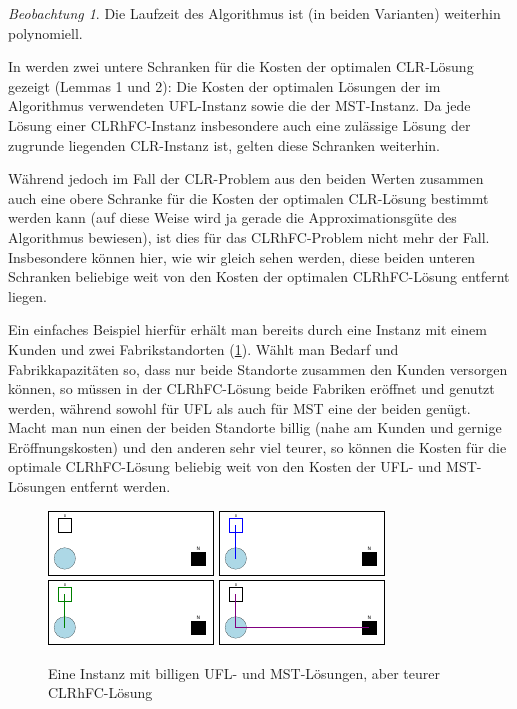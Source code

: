 \documentclass[a4paper,ngerman,11pt,bibtotoc]{scrartcl}
\theoremstyle{definition}
\theoremstyle{plain}
\theoremstyle{remark}
\newtheorem{beob}[defn]{Beobachtung}
\newcommand{\CLR}{CLR}
\newcommand{\CLRHFC}{CLRhFC}
\newcommand{\MST}{MST}
\newcommand{\UFL}{UFL}
\begin{document}
	\begin{beob}
		Die Laufzeit des Algorithmus ist (in beiden Varianten) weiterhin polynomiell. 
	\end{beob}
	
	In \cite{AAfCLR} werden zwei untere Schranken für die Kosten der optimalen \CLR-Lösung gezeigt (Lemmas 1 und 2): Die Kosten der optimalen Lösungen der im Algorithmus verwendeten \UFL-Instanz sowie die der \MST-Instanz. Da jede Lösung einer \CLRHFC-Instanz insbesondere auch eine zulässige Lösung der zugrunde liegenden \CLR-Instanz ist, gelten diese Schranken weiterhin.
	
	Während jedoch im Fall der \CLR-Problem aus den beiden Werten zusammen auch eine obere Schranke für die Kosten der optimalen \CLR-Lösung bestimmt werden kann (auf diese Weise wird ja gerade die Approximationsgüte des Algorithmus bewiesen), ist dies für das \CLRHFC-Problem nicht mehr der Fall. Insbesondere können hier, wie wir gleich sehen werden, diese beiden unteren Schranken beliebige weit von den Kosten der optimalen \CLRHFC-Lösung entfernt liegen.
	
	Ein einfaches Beispiel hierfür erhält man bereits durch eine Instanz mit einem Kunden und zwei Fabrikstandorten (\cref{fig:bsp:schlechteUntereSchranken}). Wählt man Bedarf und Fabrikkapazitäten so, dass nur beide Standorte zusammen den Kunden versorgen können, so müssen in der \CLRHFC-Lösung beide Fabriken eröffnet und genutzt werden, während sowohl für \UFL{} als auch für \MST{} eine der beiden genügt. Macht man nun einen der beiden Standorte billig (nahe am Kunden und gernige Eröffnungskosten) und den anderen sehr viel teurer, so können die Kosten für die optimale \CLRHFC-Lösung beliebig weit von den Kosten der \UFL- und \MST-Lösungen entfernt werden.
	
	\begin{figure}[h]\centering
		\includegraphics[width=.24\textwidth]{bilder/beispiele/bsp1-instance.pdf}
		\includegraphics[width=.24\textwidth]{bilder/beispiele/bsp1-UFL.pdf}
		\includegraphics[width=.24\textwidth]{bilder/beispiele/bsp1-Tree.pdf}
		\includegraphics[width=.24\textwidth]{bilder/beispiele/bsp1-tours.pdf}
		\caption{Eine Instanz mit billigen \UFL- und \MST-Lösungen, aber teurer \CLRHFC-Lösung}\label{fig:bsp:schlechteUntereSchranken}
	\end{figure}
		
\end{document}
